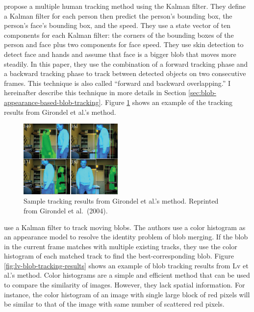  propose a multiple human tracking
method using the Kalman filter. They define a Kalman filter for each
person then predict the person's bounding box, the person's face's
bounding box, and the speed. They use a state vector of ten components
for each Kalman filter: the corners of the bounding boxes of the
person and face plus two components for face speed. They use skin
detection to detect face and hands and assume that face is a bigger
blob that moves more steadily. In this paper, they use the combination
of a forward tracking phase and a backward tracking phase to track
between detected objects on two consecutive frames. This technique is
also called ``forward and backward overlapping.'' I hereinafter
describe this technique in more details in
Section \ref{sec:blob-appearance-based-blob-tracking}.
Figure \ref{fig:girondel-tracking-result} shows an example of the
tracking results from Girondel et al.'s method.

\begin{figure}[t]
  \centering
  \includegraphics[width=2in]{figures/girondel-tracking-result.png}
  \caption[Sample tracking results from Girondel et al.'s
    method.]{\small Sample tracking results from Girondel et al.'s
    method. Reprinted from Girondel et al.\ (2004).}
  \label{fig:girondel-tracking-result}
\end{figure}

 use a Kalman filter to track moving
blobs. The authors use a color histogram as an appearance model to
resolve the identity problem of blob merging. If the blob in the
current frame matches with multiple existing tracks, they use the
color histogram of each matched track to find the best-corresponding
blob. Figure \ref{fig:lv-blob-tracking-results} shows an example of
blob tracking results from Lv et al.'s method.  Color histograms are a
simple and efficient method that can be used to compare the similarity
of images. However, they lack spatial information. For instance, the
color histogram of an image with single large block of red pixels will
be similar to that of the image with same number of scattered red
pixels.

